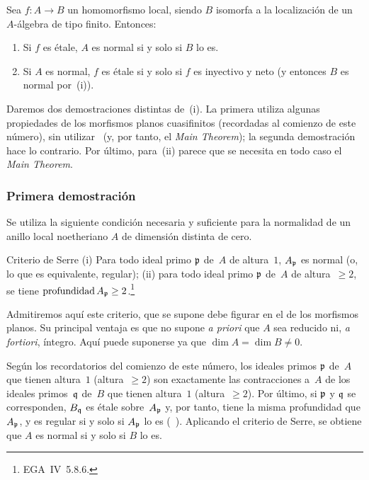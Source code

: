 \begin{theoreme}
\label{I.9.5}
Sea $f\colon A\to B$ un homomorfismo local, siendo $B$ isomorfa a la localización de un $A$-álgebra de tipo finito. Entonces:
\begin{enumerate}
\item[(i)] Si $f$ es étale, $A$ es normal si y solo si $B$ lo es.
\item[(ii)] Si $A$ es normal, $f$ es étale si y solo si $f$ es inyectivo y neto (y entonces $B$ es normal por~\textup{(i)}).
\end{enumerate}
\end{theoreme}

Daremos dos demostraciones distintas de~(i). La primera utiliza algunas propiedades de los morfismos planos cuasifinitos (recordadas al comienzo de este número), sin utilizar~ (y, por tanto, el \emph{Main Theorem}); la segunda demostración hace lo contrario. Por último, para~(ii) parece que se necesita en todo caso el \emph{Main Theorem}.

\subsubsection*{Primera demostración}
Se utiliza la siguiente condición necesaria y suficiente
para la normalidad de un anillo local noetheriano $A$ de dimensión distinta de cero.

\begin{enonce*}{Criterio de Serre}
%
\textup{(i)} Para todo ideal primo $\mathfrak{p}$ de~$A$ de altura~$1$, $A_{\mathfrak{p}}$ es normal (o, lo que es equivalente, regular); \textup{(ii)} para todo ideal primo $\mathfrak{p}$ de~$A$ de altura~$\geq2$, se tiene $\operatorname{profundidad}A_{\mathfrak{p}}\geq2$.\footnote{\Cf EGA~IV~5.8.6.}
\end{enonce*}

Admitiremos aquí este criterio, que se supone debe figurar en el  de los morfismos planos. Su principal ventaja es que no supone \emph{a priori} que $A$ sea reducido ni, \emph{a fortiori}, íntegro. Aquí puede suponerse ya que $\dim A=\dim B\neq0$.

Según los recordatorios del comienzo de este número, los ideales primos $\mathfrak{p}$ de~$A$ que tienen altura~$1$ (\resp altura~$\geq2$) son exactamente las contracciones a~$A$ de los ideales primos~$\mathfrak{q}$ de~$B$ que tienen altura~$1$ (\resp altura~$\geq2$). Por último, si $\mathfrak{p}$ y $\mathfrak{q}$ se corresponden, $B_{\mathfrak{q}}$ es étale sobre~$A_{\mathfrak{p}}$ y, por tanto, tiene la misma profundidad que $A_{\mathfrak{p}}$, y es regular si y solo si $A_{\mathfrak{p}}$ lo es (~). Aplicando el criterio de Serre, se obtiene que $A$ es normal si y solo si $B$ lo es.

